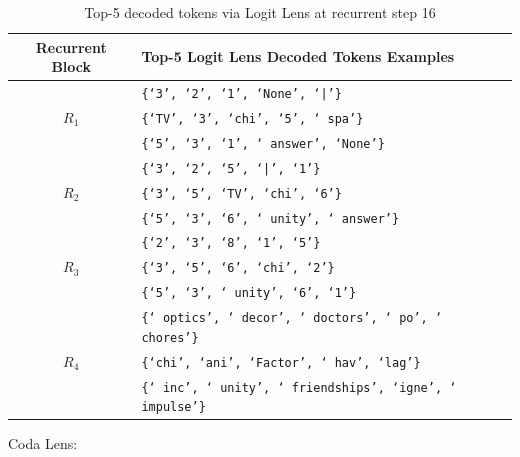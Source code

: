 \documentclass{article} %
\begin{document}
    \begin{table}[H]
        \centering
        \begin{tabularx}{\columnwidth}{|c|X|}
            \hline
            \textbf{Recurrent Block} & \textbf{Top-5 Logit Lens Decoded Tokens Examples} \\
            \hline
            \multirow{3}{*}{$R_1$} 
                & \texttt{\{`3', `2', `1', `None', `|'\}} \\
                & \texttt{\{`TV', `3', `chi', `5', ` spa'\}} \\
                & \texttt{\{`5', `3', `1', ` answer', `None'\}} \\
            \hline
            \multirow{3}{*}{$R_2$} 
                & \texttt{\{`3', `2', `5', `|', `1'\}} \\
                & \texttt{\{`3', `5', `TV', `chi', `6'\}} \\
                & \texttt{\{`5', `3', `6', ` unity', ` answer'\}} \\
            \hline
            \multirow{3}{*}{$R_3$} 
                & \texttt{\{`2', `3', `8', `1', `5'\}} \\
                & \texttt{\{`3', `5', `6', `chi', `2'\}} \\
                & \texttt{\{`5', `3', ` unity', `6', `1'\}} \\
            \hline
            \multirow{3}{*}{$R_4$} 
                & \texttt{\{` optics', ` decor', ` doctors', ` po', ` chores'\}} \\
                & \texttt{\{`chi', `ani', `Factor', ` hav', `lag'\}} \\
                & \texttt{\{` inc', ` unity', ` friendships', `igne', ` impulse'\}} \\
            \hline
        \end{tabularx}
        \caption{Top-5 decoded tokens via Logit Lens at recurrent step 16}
        \label{tab:logit-r16}
    \end{table}
\pagebreak
Coda Lens:
\end{document}
